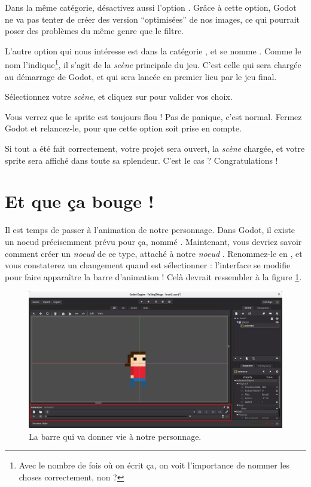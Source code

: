 Dans la même catégorie, désactivez aussi l'option . Grâce à cette option, Godot ne va pas tenter de créer des version ``optimisées'' de nos images, ce qui pourrait poser des problèmes du même genre que le filtre.

L'autre option qui nous intéresse est dans la catégorie , et se nomme . Comme le nom l'indique\footnote{Avec le nombre de fois où on écrit ça, on voit l'importance de nommer les choses correctement, non ?}, il s'agit de la \emph{scène} principale du jeu. C'est celle qui sera chargée au démarrage de Godot, et qui sera lancée en premier lieu par le jeu final.

Sélectionnez votre \emph{scène}, et cliquez sur  pour valider vos choix.

Vous verrez que le sprite est toujours flou ! Pas de panique, c'est normal. Fermez Godot et relancez-le, pour que cette option soit prise en compte.

Si tout a été fait correctement, votre projet sera ouvert, la \emph{scène} chargée, et votre sprite sera affiché dans toute sa splendeur. C'est le cas ? Congratulations !

\section{Et que ça bouge !}

Il est temps de passer à l'animation de notre personnage. Dans Godot, il existe un noeud précisemment prévu pour ça, nommé . Maintenant, vous devriez savoir comment créer un \emph{noeud} de ce type, attaché à notre \emph{noeud} . Renommez-le en , et vous constaterez un changement quand  est sélectionner : l'interface se modifie pour faire apparaître la barre d'animation ! Celà devrait ressembler à la figure \ref{lvl1-animbar}.

\begin{figure}
  \begin{center}
    \includegraphics[width=12cm]{img/lvl1-animbar.png}
  \end{center}
  \caption{\label{lvl1-animbar} La barre qui va donner vie à notre personnage.}
\end{figure}

